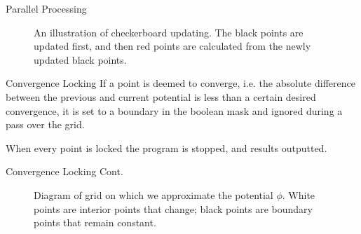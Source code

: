 \documentclass{beamer}
\begin{document}
\begin{frame}{Parallel Processing}

\begin{figure}[h!]
\begin{center}
\end{center}
\caption{An illustration of checkerboard updating. The black points are updated first,
and then red points are calculated from the newly updated black points.}
\label{fig:checker}
\end{figure}

\end{frame}

\begin{frame}{Convergence Locking}
If a point is deemed to converge, i.e. the absolute difference between the previous
and current potential is less than a certain desired convergence, it is set to a
boundary in the boolean mask and ignored during a pass over the grid.

When every point is locked the program is stopped, and results outputted.
\end{frame}

\begin{frame}{Convergence Locking Cont.}
\begin{figure}
\centering
{}
\caption{Diagram of grid on which we approximate the potential $\phi$. White points
are interior points that change; black points are boundary points that remain constant.}
\end{figure}

\end{frame}
\end{document}
